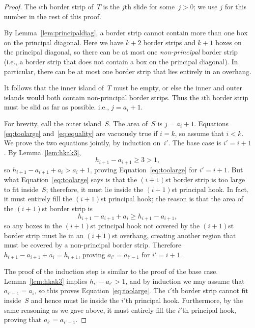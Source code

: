 \documentclass[12pt]{article}
\theoremstyle{definition}
\begin{document}
\begin{proof}

The $i$th border strip of~$T$ is the $j$th slide for some~$j>0$;
we use $j$ for this number in the rest of this proof.


By Lemma~\ref{lem:principaldiag},
a border strip cannot contain more than one box
on the principal diagonal.
Here we have $k+2$ border strips and $k+1$ boxes on the principal diagonal,
so there can be at most one \emph{non-principal} border strip
(i.e., a border strip that does not contain a box on the principal diagonal).
In particular, there can be at most one border strip that
lies entirely in an overhang.


It follows that the inner island of~$T$ must be empty,
or else the inner and outer islands would both contain
non-principal border strips.
Thus the $i$th border strip must be slid as far as possible.
i.e., $j=a_i+1$.


For brevity, call the outer island~$S$.
The area of~$S$ is $j = a_i + 1$.
Equations \eqref{eq:toolarge} and~\eqref{eq:equality}
are vacuously true if $i=k$, so assume that $i<k$.
We prove the two equations jointly, by induction on~$i'$.
The base case is $i'=i+1$.
By Lemma~\ref{lem:hkak3},
\begin{equation*}
h_{i+1} - a_{i+1} \ge 3 > 1,
\end{equation*}
so $h_{i+1} - a_{i+1} + a_i > a_i + 1$,
proving Equation~\eqref{eq:toolarge} for $i' = i+1$.
But what Equation~\eqref{eq:toolarge} says is that
the $(i+1)$st border strip is too large to fit inside~$S$;
therefore, it must lie inside the $(i+1)$st principal hook.
In fact, it must entirely fill the $(i+1)$st principal hook;
the reason is that the area of the $(i+1)$st border strip is
\begin{equation*}
h_{i+1}-a_{i+1} + a_i \ge h_{i+1} - a_{i+1},
\end{equation*}
so any boxes in the $(i+1)$st principal hook not covered by
the $(i+1)$st border strip must lie in an
$(i+1)$st overhang, creating another region 
that must be covered by a non-principal border strip.
Therefore $h_{i+1} - a_{i+1} + a_i = h_{i+1}$,
proving $a_{i'} = a_{i'-1}$ for $i'=i+1$.


The proof of the induction step is similar to the proof of the base case.
Lemma~\ref{lem:hkak3} implies $h_{i'} - a_{i'} > 1$,
and by induction we may assume that $a_{i'-1} = a_i$,
so this proves Equation~\eqref{eq:toolarge}.
The $i'$th border strip cannot fit inside~$S$
and hence must lie inside the $i'$th principal hook.
Furthermore, by the same reasoning as we gave above,
it must entirely fill the $i'$th principal hook,
proving that $a_{i'} = a_{i'-1}$.



\end{proof}
\end{document}

